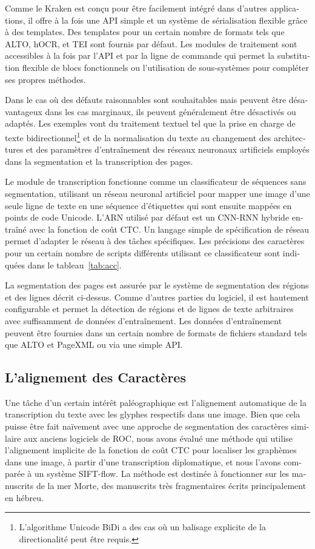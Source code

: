 \begin{french}
Comme le Kraken est conçu pour être facilement intégré dans d'autres
applications, il offre à la fois une API simple et un système de sérialisation
flexible grâce à des templates. Des templates pour un certain nombre de formats
tels que ALTO, hOCR, et TEI sont fournis par défaut. Les modules de traitement
sont accessibles à la fois par l'API et par la ligne de commande qui permet la
substitution flexible de blocs fonctionnels ou l'utilisation de sous-systèmes
pour compléter ses propres méthodes.

Dans le cas où des défauts raisonnables sont souhaitables mais peuvent être
désavantageux dans les cas marginaux, ils peuvent généralement être désactivés
ou adaptés. Les exemples vont du traitement textuel tel que la prise en charge
de texte bidirectionnel\footnote{L'algorithme Unicode BiDi a des cas où un
balisage explicite de la directionalité peut être requis.} et de la
normalisation du texte au changement des architectures et des paramètres
d'entraînement des réseaux neuronaux artificiels employés dans la segmentation
et la transcription des pages.

Le module de transcription fonctionne comme un classificateur de séquences sans
segmentation, utilisant un réseau neuronal artificiel pour mapper une image
d'une seule ligne de texte en une séquence d'étiquettes qui sont ensuite
mappées en points de code Unicode.  L'ARN utilisé par défaut est un CNN-RNN
hybride entraîné avec la fonction de coût CTC. Un langage simple de
spécification de réseau permet d'adapter le réseau à des tâches spécifiques.
Les précisions des caractères pour un certain nombre de scripts différents
utilisant ce classificateur sont indiquées dans le tableau~\ref{tab:acc}.

La segmentation des pages est assurée par le système de segmentation des
régions et des lignes décrit ci-dessus. Comme d'autres parties du logiciel, il
est hautement configurable et permet la détection de régions et de lignes de
texte arbitraires avec suffisamment de données d'entraînement. Les données
d'entraînement peuvent être fournies dans un certain nombre de formats de
fichiers standard tels que ALTO et PageXML ou via une simple API.

\subsection{L'alignement des Caractères}

Une tâche d'un certain intérêt paléographique est l'alignement automatique de
la transcription du texte avec les glyphes respectifs dans une image. Bien que
cela puisse être fait naïvement avec une approche de segmentation des
caractères similaire aux anciens logiciels de ROC, nous avons évalué une
méthode qui utilise l'alignement implicite de la fonction de coût CTC pour
localiser les graphèmes dans une image, à partir d'une transcription
diplomatique, et nous l'avons comparée à un système SIFT-flow. La méthode est
destinée à fonctionner sur les manuscrits de la mer Morte, des manuscrits très
fragmentaires écrits principalement en hébreu.


\end{french}
